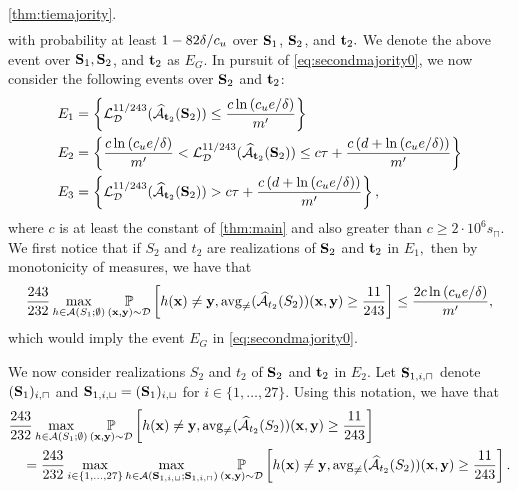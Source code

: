 \begin{proofof}{\cref{thm:tiemajority}.}
\begin{align}
\end{align}
with probability at least $ 1-82\delta/c_{u} $ over $ \mathbf{S}_{1} $, $ \mathbf{S}_{2}$, and $ \mathbf{t}_{2}.$ We denote  the above event  over $ \mathbf{S}_{1},\mathbf{S}_{2} $, and $ \mathbf{t}_{2}$ as  $ E_{G}.$   
In pursuit of \cref{eq:secondmajority0}, we now consider the following events over $ \mathbf{S}_{2}  $ and $ \mathbf{t}_{2} $:  
\begin{align*}
E_{1} &= \left\{ \operatorname{\mathcal{L}}_{\mathcal{D}}^{11/243}(\widehat{\mathcal{A}}_{\mathbf{t}_{2}}(\mathbf{S}_{2}))\leq  \frac{c\ln{\left(c_{u}e/\delta \right)}}{m'} \right\}
 \\
E_{2} &= \left\{ \frac{c\ln{\left(c_{u}e/\delta \right)}}{m'} < \operatorname{\mathcal{L}}_{\mathcal{D}}^{11/243}(\widehat{\mathcal{A}}_{\mathbf{t}_{2}}(\mathbf{S}_{2}))\leq  c\tau+\frac{c\left(d+\ln{(c_{u}e/\delta )}\right)}{m'}\right\}
 \\
E_{3} &= \left\{ \operatorname{\mathcal{L}}_{\mathcal{D}}^{11/243}(\widehat{\mathcal{A}}_{\mathbf{t}_{2}}(\mathbf{S}_{2}))>  c\tau+\frac{c\left(d+\ln{(c_{u}e/\delta )}\right)}{m'}\right\},  
\end{align*}
where $c$ is at least the constant of \cref{thm:main} and also greater than $ c\geq 2\cdot 10^{6}s_{\sqcap}$.
We first notice that if $ S_{2} $ and $ t_{2} $   are realizations of $ \mathbf{S}_{2} $ and $ \mathbf{t}_{2} $ in $ E_{1},$ then by monotonicity of measures, we have that  
\begin{align}\label{eq:secondmajority9} 
    \frac{243}{232}\max_{h\in \mathcal{A}(S_{1};\emptyset)}\operatorname*{\mathbb{P}}_{(\mathbf{x},\mathbf{y})\sim \mathcal{D}}\left[h(\mathbf{x})\not=\mathbf{y},\operatorname{\mathrm{avg}_{\not=}}(\widehat{\mathcal{A}}_{t_{2}}(S_{2}))(\mathbf{x},\mathbf{y})\geq \frac{11}{243}\right]\leq \frac{2c \ln{\left(c_{u}e/\delta \right)}}{m'},
\end{align}
which would imply the event $ E_{G} $ in \cref{eq:secondmajority0}.  

We now consider realizations $ S_{2} $ and $ t_{2} $ of $ \mathbf{S}_{2} $ and $ \mathbf{t}_{2} $ in $ E_{2}.$ 
Let $ \mathbf{S}_{1,i,\sqcap}$ denote  $ (\mathbf{S}_{1})_{i,\sqcap} $ and  $ \mathbf{S}_{1,i,\sqcup}=(\mathbf{S}_{1})_{i,\sqcup}$ for $ i\in \{  1,\ldots,27\}.$
Using this notation, we have that 
\begin{align*}
& \frac{243}{232}\max_{h\in \mathcal{A}(S_{1};\emptyset)}\operatorname*{\mathbb{P}}_{(\mathbf{x},\mathbf{y})\sim \mathcal{D}}\left[h(\mathbf{x})\not=\mathbf{y},\operatorname{\mathrm{avg}_{\not=}}(\widehat{\mathcal{A}}_{t_{2}}(S_{2}))(\mathbf{x},\mathbf{y})\geq \frac{11}{243}\right]
    \\
&\quad =\frac{243}{232}\max_{i\in\{  1,\ldots,27\} } \max_{h\in \mathcal{A}(\mathbf{S}_{1,i,\sqcup};\mathbf{S}_{1,i,\sqcap})}\operatorname*{\mathbb{P}}_{(\mathbf{x},\mathbf{y})\sim \mathcal{D}}\left[h(\mathbf{x})\not=\mathbf{y},\operatorname{\mathrm{avg}_{\not=}}(\widehat{\mathcal{A}}_{t_{2}}(S_{2}))(\mathbf{x},\mathbf{y})\geq \frac{11}{243}\right].
\end{align*}


\end{proofof}
